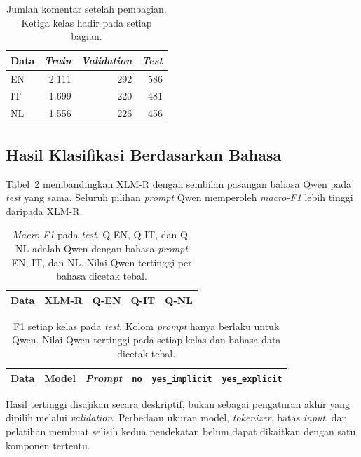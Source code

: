\documentclass[11pt]{article}
\begin{document}
\begin{table}[t]
\centering\small
\begin{tabular}{lrrr}
\toprule
Data & \textit{Train} & \textit{Validation} & \textit{Test} \\
\midrule
EN & 2.111 & 292 & 586 \\
IT & 1.699 & 220 & 481 \\
NL & 1.556 & 226 & 456 \\
\bottomrule
\end{tabular}
\caption{Jumlah komentar setelah pembagian. Ketiga kelas hadir pada setiap bagian.}
\label{tab:split}
\end{table}

\subsection{Hasil Klasifikasi Berdasarkan Bahasa}
Tabel~\ref{tab:main} membandingkan XLM-R dengan sembilan pasangan bahasa Qwen pada \textit{test} yang sama. Seluruh pilihan \textit{prompt} Qwen memperoleh \textit{macro-F1} lebih tinggi daripada XLM-R.

\begin{table}[t]
\centering\small
\setlength{\tabcolsep}{2pt}
\begin{tabular}{lrrrr}
\toprule
Data & XLM-R & Q-EN & Q-IT & Q-NL \\
\midrule

\end{tabular}
\caption{\textit{Macro-F1} pada \textit{test}. Q-EN, Q-IT, dan Q-NL adalah Qwen dengan bahasa \textit{prompt} EN, IT, dan NL. Nilai Qwen tertinggi per bahasa dicetak tebal.}
\label{tab:main}
\end{table}

\begin{table}[t]
\centering\small
\begin{tabular}{lllrrr}
\toprule
Data & Model & \textit{Prompt} & \texttt{no} & \texttt{yes\_implicit} & \texttt{yes\_explicit} \\
\midrule

\end{tabular}
\caption{F1 setiap kelas pada \textit{test}. Kolom \textit{prompt} hanya berlaku untuk Qwen. Nilai Qwen tertinggi pada setiap kelas dan bahasa data dicetak tebal.}
\label{tab:classes}
\end{table}

Hasil tertinggi disajikan secara deskriptif, bukan sebagai pengaturan akhir yang dipilih melalui \textit{validation}. Perbedaan ukuran model, \textit{tokenizer}, batas \textit{input}, dan pelatihan membuat selisih kedua pendekatan belum dapat dikaitkan dengan satu komponen tertentu.
\end{document}
